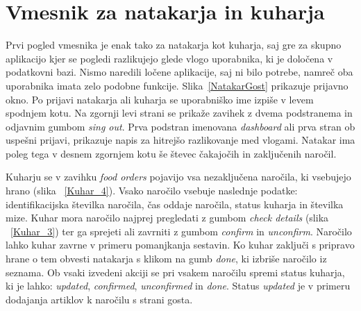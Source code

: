 \documentclass[a4paper, 12pt]{book}
\begin{document}
\section{Vmesnik za natakarja in kuharja}
Prvi pogled vmesnika je enak tako za natakarja kot kuharja, saj gre za skupno aplikacijo kjer se pogledi razlikujejo glede vlogo uporabnika, ki je določena v podatkovni bazi. Nismo naredili ločene aplikacije, saj ni bilo potrebe, namreč oba uporabnika imata zelo podobne funkcije. Slika~\ref{NatakarGost} prikazuje prijavno okno. Po prijavi natakarja ali kuharja se uporabniško ime izpiše v levem spodnjem kotu. Na zgornji levi strani se prikaže zavihek z dvema podstranema in odjavnim gumbom \textit{sing out}. Prva podstran imenovana \textit{dashboard} ali prva stran ob uspešni prijavi, prikazuje napis za hitrejšo razlikovanje med vlogami. Natakar ima poleg tega v desnem zgornjem kotu še števec čakajočih in zaključenih naročil.

Kuharju se v zavihku \textit{food orders} pojavijo vsa nezaključena naročila, ki vsebujejo hrano (slika ~\ref{Kuhar_4}). Vsako naročilo vsebuje naslednje podatke: identifikacijska številka naročila, čas oddaje naročila, status kuharja in številka mize. Kuhar mora naročilo najprej pregledati z gumbom \textit{check details} (slika  ~\ref{Kuhar_3}) ter ga sprejeti ali zavrniti z gumbom \textit{confirm} in \textit{unconfirm}. Naročilo lahko kuhar zavrne v primeru pomanjkanja sestavin. Ko kuhar zaključi s pripravo hrane o tem obvesti natakarja s klikom na gumb \textit{done}, ki izbriše naročilo iz seznama. Ob vsaki izvedeni akciji se pri vsakem naročilu spremi status kuharja, ki je lahko: \textit{updated}, \textit{confirmed}, \textit{unconfirmed} in \textit{done}. Status \textit{updated} je v primeru dodajanja artiklov k naročilu s strani gosta.
\end{document}
